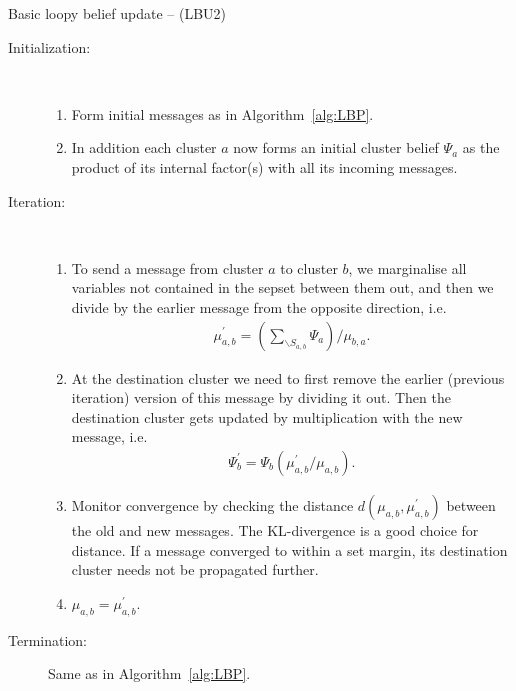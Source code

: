 \documentclass[oneside,english]{scrbook}
\begin{document}
\begin{algorithm}[!h]
  \caption{Basic loopy belief update -- (LBU2)}  \label{alg:LBU2}
  \begin{description}
  \item[Initialization:]~\\[-5mm]
    \begin{enumerate}
    \item Form initial messages as in Algorithm~\ref{alg:LBP}.
    \item In addition each cluster $a$ now forms an initial cluster
      belief $\Psi_a$ as the product of its internal factor(s) with
      all its incoming messages.
    \end{enumerate}
  \item[Iteration:]~\\[-5mm]
    \begin{enumerate}
    \item To send a message from cluster $a$ to cluster $b$, we
      marginalise all variables not contained in the sepset between
      them out, and then we divide by the earlier message from the
      opposite direction, i.e.
      \begin{align}
        \mu^{'}_{a,b} = \left(\sum_{\backslash S_{a,b}} \Psi_a\right)/\mu_{b,a}. \nonumber
      \end{align}
    \item At the destination cluster we need to first remove the
      earlier (previous iteration) version of this message by
      dividing it out. Then the destination cluster gets updated
      by multiplication with the new message, i.e.
      \begin{align}
        \Psi^{'}_{b} = \Psi_b\left(\mu^{'}_{a,b}/\mu_{a,b}\right). \label{eq:clusterupdate}
      \end{align}
    \item Monitor convergence by checking the distance
      $d(\mu_{a,b},\mu^{'}_{a,b})$ between the old and new messages. The
      KL-divergence is a good choice for distance. If a message
      converged to within a set margin, its destination cluster needs
      not be propagated further.
    \item $\mu_{a,b} = \mu^{'}_{a,b}.$
    \end{enumerate}
  \item[Termination:] Same as in Algorithm~\ref{alg:LBP}.
  \end{description}
\end{algorithm}
\end{document}
